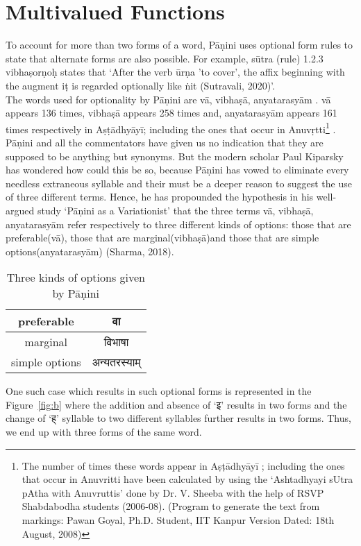 \section{Multivalued Functions}
To account for more than two forms of a word, Pāṇini uses optional form rules to state that alternate forms are also possible. For example, sūtra (rule) 1.2.3 vibhaṣorṇoḥ states that ‘After the verb ūrṇa 'to cover', the affix beginning with the augment iṭ is regarded optionally like ṅit (Sutravali, 2020)’.\\
The words used for optionality by Pāṇini are vā, vibhaṣā, anyatarasyām . vā appears 136 times, vibhaṣā appears 258 times and, anyatarasyām appears 161 times respectively in Aṣṭādhyāyī; including the ones that occur in Anuvṛtti\footnote{The number of times these words appear in Aṣṭādhyāyī ; including the ones that occur in Anuvritti have been calculated by using the ‘Ashtadhyayi sUtra pAtha with Anuvruttis’ done by Dr. V. Sheeba with the help of RSVP Shabdabodha students (2006-08).
 (Program to generate the text from markings: Pawan Goyal, Ph.D. Student, IIT Kanpur Version Dated: 18th August, 2008)
} . Pāṇini and all the commentators have given us no indication that they are supposed to be anything but synonyms. But the modern scholar Paul Kiparsky has wondered how could this be so, because Pāṇini has vowed to eliminate every needless extraneous syllable and their must be a deeper reason to suggest the use of three different terms. Hence, he has propounded the hypothesis in his well-argued study ‘Pāṇini as a Variationist’ that the three terms vā, vibhaṣā, anyatarasyām refer respectively to three different kinds of options: those that are preferable(vā), those that are marginal(vibhaṣā)and those that are simple options(anyatarasyām) (Sharma, 2018).\\

\begin{center}
\begin{table}[h!]
\begin{tabular}{ |c|c| } 
\hline
preferable &\texthindi{वा} \\ 
\hline
marginal	&\texthindi{विभाषा }\\ 
\hline
simple options	&\texthindi{अन्यतरस्याम्} \\ 
\hline
\end{tabular}
\caption{Three kinds of options given by Pāṇini}
\label{table:5.2}
\end{table}
\end{center}
One such case which results in such optional forms is represented in the Figure~\ref{fig:b} where the addition and absence of ‘\texthindi{इ}’ results in two forms and the change of ‘\texthindi{ह्}’ syllable to two different syllables further results in two forms. Thus, we end up with three forms of the same word.\\

